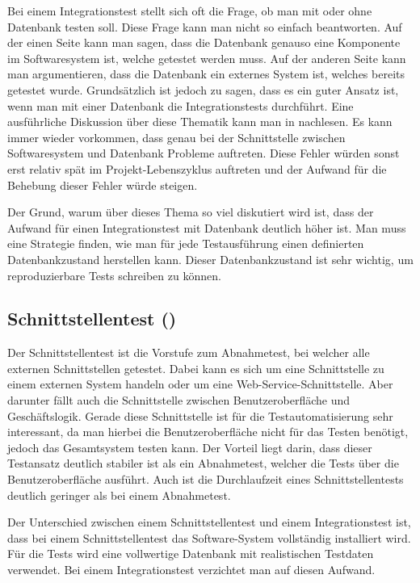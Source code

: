 \SuperPar
Bei einem Integrationstest stellt sich oft die Frage, ob man mit oder ohne Datenbank testen soll. Diese Frage kann man nicht so einfach beantworten. Auf der einen Seite kann man sagen, dass die Datenbank genauso eine Komponente im Softwaresystem ist, welche getestet werden muss. Auf der anderen Seite kann man argumentieren, dass die Datenbank ein externes System ist, welches bereits getestet wurde. Grundsätzlich ist jedoch zu sagen, dass es ein guter Ansatz ist, wenn man mit einer Datenbank die Integrationstests durchführt. Eine ausführliche Diskussion über diese Thematik kann man in  \cite{intTest} nachlesen. Es kann immer wieder vorkommen, dass genau bei der Schnittstelle zwischen Softwaresystem und Datenbank Probleme auftreten. Diese Fehler würden sonst erst relativ spät im Projekt-Lebenszyklus auftreten und der Aufwand für die Behebung dieser Fehler würde steigen.

\SuperPar
Der Grund, warum über dieses Thema so viel diskutiert wird ist, dass der Aufwand für einen Integrationstest mit Datenbank deutlich höher ist. Man muss eine Strategie finden, wie man für jede Testausführung einen definierten Datenbankzustand herstellen kann. Dieser Datenbankzustand ist sehr wichtig, um reproduzierbare Tests schreiben zu können. 


\subsection{Schnittstellentest ()}

Der Schnittstellentest ist die Vorstufe zum Abnahmetest, bei welcher alle externen Schnittstellen getestet. Dabei kann es sich um eine Schnittstelle zu einem externen System handeln oder um eine Web-Service-Schnittstelle. Aber darunter fällt auch die Schnittstelle zwischen Benutzeroberfläche und Geschäftslogik. Gerade diese Schnittstelle ist für die Testautomatisierung sehr interessant, da man hierbei die Benutzeroberfläche nicht für das Testen benötigt, jedoch das Gesamtsystem testen kann. Der Vorteil liegt darin, dass dieser Testansatz deutlich stabiler ist als ein Abnahmetest, welcher die Tests über die Benutzeroberfläche ausführt. Auch ist die Durchlaufzeit eines Schnittstellentests deutlich geringer als bei einem Abnahmetest.

\SuperPar
Der Unterschied zwischen einem Schnittstellentest und einem Integrationstest ist, dass bei einem Schnittstellentest das Software-System vollständig installiert wird. Für die Tests wird eine vollwertige Datenbank mit realistischen Testdaten verwendet. Bei einem Integrationstest verzichtet man auf diesen Aufwand.

